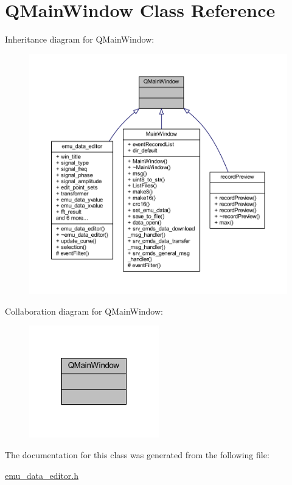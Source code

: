 \hypertarget{a00010}{\section{Q\+Main\+Window Class Reference}
\label{a00010}
}


Inheritance diagram for Q\+Main\+Window\+:
\nopagebreak
\begin{figure}[H]
\begin{center}
\leavevmode
\includegraphics[width=350pt]{d4/d5b/a00294}
\end{center}
\end{figure}


Collaboration diagram for Q\+Main\+Window\+:
\nopagebreak
\begin{figure}[H]
\begin{center}
\leavevmode
\includegraphics[width=160pt]{d9/d5e/a00295}
\end{center}
\end{figure}


The documentation for this class was generated from the following file\+:\begin{DoxyCompactItemize}
\item 
\hyperlink{a00036}{emu\+\_\+data\+\_\+editor.\+h}\end{DoxyCompactItemize}
